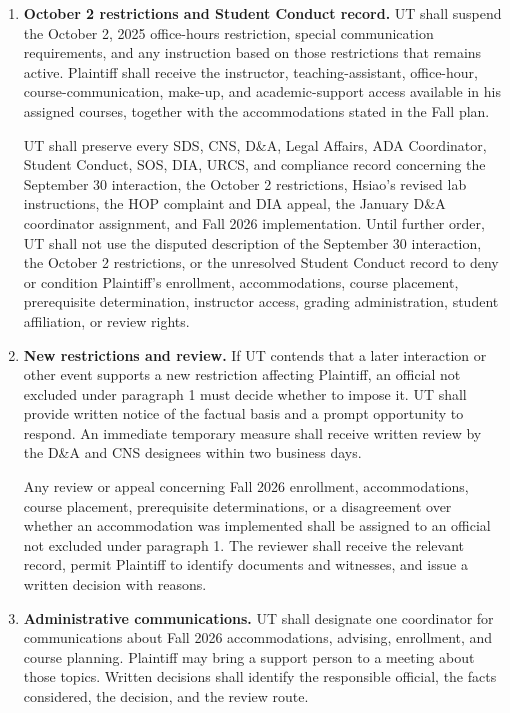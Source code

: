 \documentclass[12pt]{article}
\begin{document}
\begin{enumerate}
\item \textbf{October 2 restrictions and Student Conduct record.} UT shall suspend the October 2, 2025 office-hours restriction, special communication requirements, and any instruction based on those restrictions that remains active. Plaintiff shall receive the instructor, teaching-assistant, office-hour, course-communication, make-up, and academic-support access available in his assigned courses, together with the accommodations stated in the Fall plan.

UT shall preserve every SDS, CNS, D\&A, Legal Affairs, ADA Coordinator, Student Conduct, SOS, DIA, URCS, and compliance record concerning the September 30 interaction, the October 2 restrictions, Hsiao's revised lab instructions, the HOP complaint and DIA appeal, the January D\&A coordinator assignment, and Fall 2026 implementation. Until further order, UT shall not use the disputed description of the September 30 interaction, the October 2 restrictions, or the unresolved Student Conduct record to deny or condition Plaintiff's enrollment, accommodations, course placement, prerequisite determination, instructor access, grading administration, student affiliation, or review rights.

\item \textbf{New restrictions and review.} If UT contends that a later interaction or other event supports a new restriction affecting Plaintiff, an official not excluded under paragraph 1 must decide whether to impose it. UT shall provide written notice of the factual basis and a prompt opportunity to respond. An immediate temporary measure shall receive written review by the D\&A and CNS designees within two business days.

Any review or appeal concerning Fall 2026 enrollment, accommodations, course placement, prerequisite determinations, or a disagreement over whether an accommodation was implemented shall be assigned to an official not excluded under paragraph 1. The reviewer shall receive the relevant record, permit Plaintiff to identify documents and witnesses, and issue a written decision with reasons.

\item \textbf{Administrative communications.} UT shall designate one coordinator for communications about Fall 2026 accommodations, advising, enrollment, and course planning. Plaintiff may bring a support person to a meeting about those topics. Written decisions shall identify the responsible official, the facts considered, the decision, and the review route.


\end{enumerate}
\end{document}
